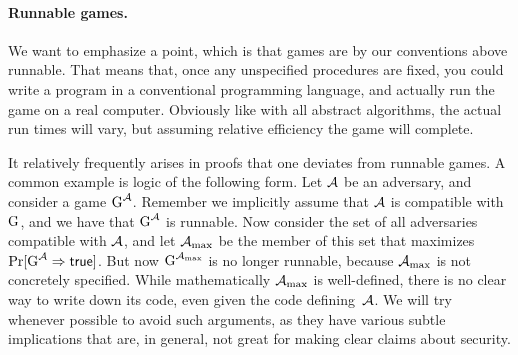 \paragraph{Runnable games.}  We want to emphasize a point, which is that games
are by our conventions above runnable. That means that, once any unspecified
procedures are fixed, you could write a program in a conventional programming
language, and actually run the game on a real computer. Obviously like with all
abstract algorithms, the actual run times will vary, but assuming relative
efficiency the game will complete.  

It relatively frequently arises in proofs that one deviates from runnable games.
A common example is logic of the following form. Let ${\mathcal A}$ be an adversary,
and consider a game ${{\textnormal G}}^{\mathcal A}$. Remember we implicitly assume that ${\mathcal A}$ is
compatible with ${{\textnormal G}}$, and we have that ${{\textnormal G}}^{\mathcal A}$ is runnable.  Now consider the
set of all adversaries compatible with ${\mathcal A}$, and let ${\mathcal A}_{\max}$ be the
member of this set that maximizes $\Pr[{{\textnormal G}}^{\mathcal A} \Rightarrow \mathsf{true}]$. But now
${{\textnormal G}}^{{\mathcal A}_{\max}}$ is no longer runnable, because ${\mathcal A}_{\max}$ is not
concretely specified. While mathematically ${\mathcal A}_{\max}$ is well-defined, there
is no clear way to write down its code, even given the code defining~${\mathcal A}$.
We will try whenever possible to avoid such arguments, as they have various
subtle implications that are, in general, not great for making 
clear claims about security. 





